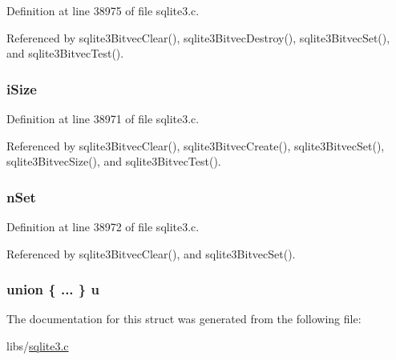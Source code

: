 Definition at line 38975 of file sqlite3.\+c.



Referenced by sqlite3\+Bitvec\+Clear(), sqlite3\+Bitvec\+Destroy(), sqlite3\+Bitvec\+Set(), and sqlite3\+Bitvec\+Test().

\hypertarget{struct_bitvec_abf05e7f8e9db5be6b0c2ddb466771371}{}
\subsubsection[{i\+Size}]{ i\+Size}\label{struct_bitvec_abf05e7f8e9db5be6b0c2ddb466771371}


Definition at line 38971 of file sqlite3.\+c.



Referenced by sqlite3\+Bitvec\+Clear(), sqlite3\+Bitvec\+Create(), sqlite3\+Bitvec\+Set(), sqlite3\+Bitvec\+Size(), and sqlite3\+Bitvec\+Test().

\hypertarget{struct_bitvec_afbfe38f73c18658d067f031ff5744288}{}
\subsubsection[{n\+Set}]{ n\+Set}\label{struct_bitvec_afbfe38f73c18658d067f031ff5744288}


Definition at line 38972 of file sqlite3.\+c.



Referenced by sqlite3\+Bitvec\+Clear(), and sqlite3\+Bitvec\+Set().

\hypertarget{struct_bitvec_ae26916aa5b937613bae3d5c61c31b57a}{}
\subsubsection[{u}]{\setlength{\rightskip}{0pt plus 5cm}union \{ ... \}   u}\label{struct_bitvec_ae26916aa5b937613bae3d5c61c31b57a}


The documentation for this struct was generated from the following file\+:\begin{DoxyCompactItemize}
\item 
libs/\hyperlink{sqlite3_8c}{sqlite3.\+c}\end{DoxyCompactItemize}
